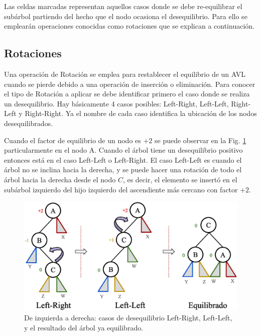Las celdas marcadas representan aquellos casos donde se debe re-equilibrar el subárbol partiendo del hecho que el nodo ocasiona el desequilibrio. Para ello se emplearán operaciones conocidas como rotaciones que se explican a continuación.

\subsection{Rotaciones}

Una operación de Rotación se emplea para restablecer el equilibrio de un AVL cuando se pierde debido a una operación de inserción o eliminación. Para conocer el tipo de Rotación a aplicar se debe identificar primero el caso donde se realiza un desequilibrio. Hay básicamente 4 casos posibles: Left-Right, Left-Left, Right-Left y Right-Right. Ya el nombre de cada caso identifica la ubicación de los nodos desequilibrados.

Cuando el factor de equilibrio de un nodo es $+2$ se puede observar en la Fig. \ref{fig:AVLRotation1} particularmente en el nodo A. Cuando el árbol tiene un desequilibrio positivo entonces está en el caso Left-Left o Left-Right. El caso Left-Left es cuando el árbol no se inclina hacia la derecha, y se puede hacer una rotación de todo el árbol hacia la derecha desde el nodo $C$, es decir, el elemento se insertó en el subárbol izquierdo del hijo izquierdo del ascendiente más cercano con factor $+2$. 

\begin{figure}[htpb!]
  \begin{center}
    \includegraphics[width=1.0\textwidth]{images/AVLRotation1.eps}
  \end{center}
  \caption{De izquierda a derecha: casos de desequilibrio Left-Right, Left-Left, y el resultado del árbol ya equilibrado.}
  \label{fig:AVLRotation1}
\end{figure}

